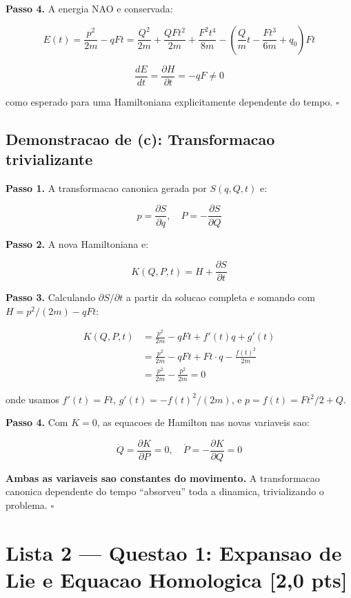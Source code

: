 \documentclass[12pt,a4paper,oneside]{article}
\begin{document}
\textbf{Passo 4.} A energia NAO e conservada:

$$E(t) = \frac{p^2}{2m} - qFt = \frac{Q^2}{2m} + \frac{QFt^2}{2m} +
\frac{F^2t^4}{8m} - \left(\frac{Q}{m}t - \frac{Ft^3}{6m} + q_0\right)Ft$$

$$\frac{dE}{dt} = \frac{\partial H}{\partial t} = -qF \neq 0$$

como esperado para uma Hamiltoniana explicitamente dependente do tempo. $\square$

\subsection*{Demonstracao de (c): Transformacao trivializante}

\textbf{Passo 1.} A transformacao canonica gerada por $S(q,Q,t)$ e:

$$p = \frac{\partial S}{\partial q}, \quad P = -\frac{\partial S}{\partial Q}$$

\textbf{Passo 2.} A nova Hamiltoniana e:

$$K(Q,P,t) = H + \frac{\partial S}{\partial t}$$

\textbf{Passo 3.} Calculando $\partial S/\partial t$ a partir da solucao
completa e somando com $H = p^2/(2m) - qFt$:

\begin{align*}
K(Q,P,t) &= \frac{p^2}{2m} - qFt + f'(t)q + g'(t) \\
&= \frac{p^2}{2m} - qFt + Ft\cdot q - \frac{f(t)^2}{2m} \\
&= \frac{p^2}{2m} - \frac{p^2}{2m} = 0
\end{align*}

onde usamos $f'(t) = Ft$, $g'(t) = -f(t)^2/(2m)$, e $p = f(t) = Ft^2/2 + Q$.

\textbf{Passo 4.} Com $K = 0$, as equacoes de Hamilton nas novas variaveis
sao:

$$\dot Q = \frac{\partial K}{\partial P} = 0, \quad
\dot P = -\frac{\partial K}{\partial Q} = 0$$

\textbf{Ambas as variaveis sao constantes do movimento.} A transformacao
canonica dependente do tempo ``absorveu'' toda a dinamica, trivializando
o problema. $\square$

\newpage
\section{Lista 2 — Questao 1: Expansao de Lie e Equacao Homologica [2,0 pts]}
\end{document}
